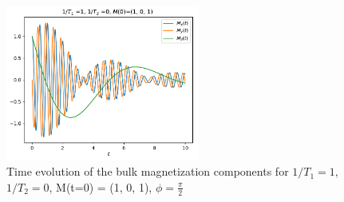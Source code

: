 \documentclass[journal]{IEEEtran} %
\begin{document}
\begin{figure}[H]
\centering
\includegraphics[width=2.5in]{figs/NMR_T1-1_T2-0_Minit-101_tau_0.01_t_10_phase_pi_2.pdf}
\caption{Time evolution of the bulk magnetization components for $1/T_1 = 1$, $1/T_2 = 0$, M(t=0) = (1, 0, 1), $\phi = \frac{\pi}{2}$}
\label{f6}
\end{figure}
\end{document}
